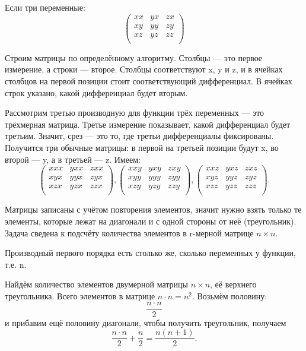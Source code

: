 Если три переменные:
$$
\begin{pmatrix}
  xx & yx & zx \\
  xy & yy & zy \\
  xz & yz & zz \\ 
\end{pmatrix}
$$

Строим матрицы по определённому алгоритму.
Столбцы --- это первое измерение, а строки --- второе.
Столбцы соответствуют x, y и z, и в ячейках столбцов на первой позиции стоит соответствующий дифференциал.
В ячейках строк указано, какой дифференциал будет вторым.

Рассмотрим третью производную для функции трёх переменных --- это трёхмерная матрица.
Третье измерение показывает, какой дифференциал будет третьим.
Значит, срез --- это то, где третьи дифференциалы фиксированы.
Получится три обычные матрицы: в первой на третьей позиции будут x, во второй --- y, а в третьей --- z.
Имеем: 
$$
\begin{pmatrix}
xxx & yxx & zxx \\ 
xyx & yyx & zyx \\
xzx & yzx & zzx \\
\end{pmatrix}
,
\begin{pmatrix}
xxy & yxy & zxy \\
xyy & yyy & zyy \\
xzy & yzy & zzy \\
\end{pmatrix}
,
\begin{pmatrix}
xxz & yxz & zxz \\
xyz & yyz & zyz \\
xzz & yzz & zzz \\
\end{pmatrix}
.$$

Матрицы записаны с учётом повторения элементов, значит нужно взять только те элементы, которые лежат на диагонали и с одной стороны от неё (треугольник).
Задача сведена к подсчёту количества элементов в r-мерной матрице $n\times n$.

Производный первого порядка есть столько же, сколько переменных у функции, т.е. n.

Найдём количество элементов двумерной матрицы $n\times n$, её верхнего треугольника.
Всего элементов в матрице $n\cdot n=n^2$.
Возьмём половину: $$\frac{n\cdot n}{2}$$ и прибавим ещё половину диагонали, чтобы получить треугольник, получаем
$$ \frac{n \cdot n}{2} + \frac{n}{2} = \frac{n(n+1)}{2}.$$

